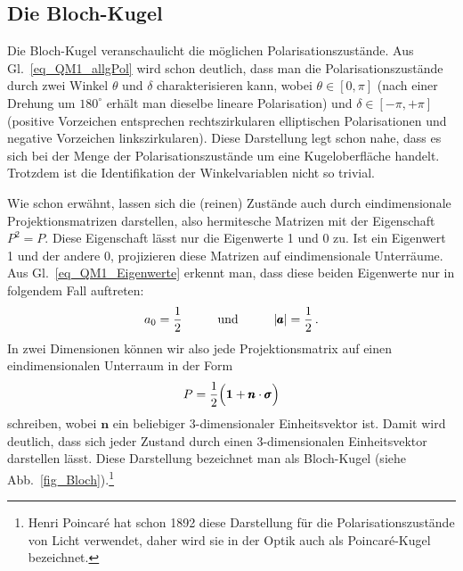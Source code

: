 \subsection{Die Bloch-Kugel}

Die Bloch-Kugel veranschaulicht die m\"oglichen Polarisationszust\"ande. Aus Gl.\ \ref{eq_QM1_allgPol} wird schon
deutlich, dass man die Polarisationszust\"ande durch zwei Winkel $\theta$ und $\delta$ charakterisieren kann,
wobei $\theta \in [0,\pi]$ (nach einer Drehung um $180^\circ$ erh\"alt man dieselbe lineare Polarisation) 
und $\delta \in [-\pi,+\pi]$ (positive Vorzeichen entsprechen rechtszirkularen elliptischen Polarisationen und
negative Vorzeichen linkszirkularen). Diese Darstellung legt schon nahe, dass es sich bei der Menge der
Polarisationszust\"ande um eine Kugeloberfl\"ache handelt. 
Trotzdem ist die Identifikation der Winkelvariablen nicht so trivial.

Wie schon erw\"ahnt, lassen sich die (reinen) Zust\"ande auch durch eindimensionale Projektionsmatrizen darstellen, 
also hermitesche Matrizen mit der Eigenschaft $P^2=P$. Diese Eigenschaft l\"asst nur die Eigenwerte 1 und 0 zu.
Ist ein Eigenwert 1 und der andere 0, projizieren diese
Matrizen auf eindimensionale Unterr\"aume. Aus Gl.\ \ref{eq_QM1_Eigenwerte} erkennt man, dass diese beiden
Eigenwerte nur in folgendem Fall auftreten:
\begin{equation}
      a_0 = \frac{1}{2}   \hspace{1cm} {\rm und} \hspace{1cm}  |\pmb{a}| = \frac{1}{2} \, .
\end{equation}
In zwei Dimensionen k\"onnen wir also jede Projektionsmatrix auf einen eindimensionalen Unterraum 
in der Form
\begin{equation}
         P =  \frac{1}{2} \Big( {\bf 1} + \pmb{n} \cdot \pmb{\sigma} \Big) 
\end{equation}
schreiben, wobei $\pmb{n}$ ein beliebiger 3-dimensionaler Einheitsvektor ist. Damit wird deutlich, dass sich jeder Zustand
durch einen 3-dimensionalen Einheitsvektor darstellen l\"asst. Diese Darstellung bezeichnet man als 
Bloch-Kugel (siehe Abb.\ \ref{fig_Bloch}).\footnote{Henri Poincar\'{e} hat schon 1892 diese Darstellung f\"ur die Polarisationszust\"ande
von Licht verwendet, daher wird sie in der Optik auch als Poincar\'{e}-Kugel bezeichnet.}

